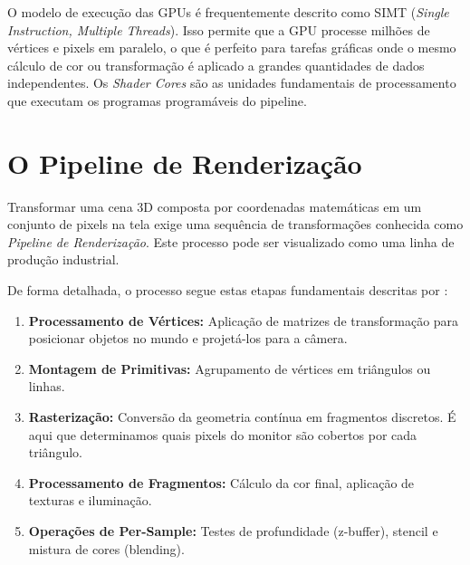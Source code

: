 O modelo de execução das GPUs é frequentemente descrito como SIMT (\textit{Single Instruction, Multiple Threads}). Isso permite que a GPU processe milhões de vértices e pixels em paralelo, o que é perfeito para tarefas gráficas onde o mesmo cálculo de cor ou transformação é aplicado a grandes quantidades de dados independentes. Os \textit{Shader Cores} são as unidades fundamentais de processamento que executam os programas programáveis do pipeline.

\section{O Pipeline de Renderização}

Transformar uma cena 3D composta por coordenadas matemáticas em um conjunto de pixels na tela exige uma sequência de transformações conhecida como \textit{Pipeline de Renderização}. Este processo pode ser visualizado como uma linha de produção industrial.

\begin{center}
\end{center}

De forma detalhada, o processo segue estas etapas fundamentais descritas por \textcite{akenine2018realtime}:
\begin{enumerate}
    \item \textbf{Processamento de Vértices:} Aplicação de matrizes de transformação para posicionar objetos no mundo e projetá-los para a câmera.
    \item \textbf{Montagem de Primitivas:} Agrupamento de vértices em triângulos ou linhas.
    \item \textbf{Rasterização:} Conversão da geometria contínua em fragmentos discretos. É aqui que determinamos quais pixels do monitor são cobertos por cada triângulo.
    \item \textbf{Processamento de Fragmentos:} Cálculo da cor final, aplicação de texturas e iluminação.
    \item \textbf{Operações de Per-Sample:} Testes de profundidade (z-buffer), stencil e mistura de cores (blending).
\end{enumerate}

